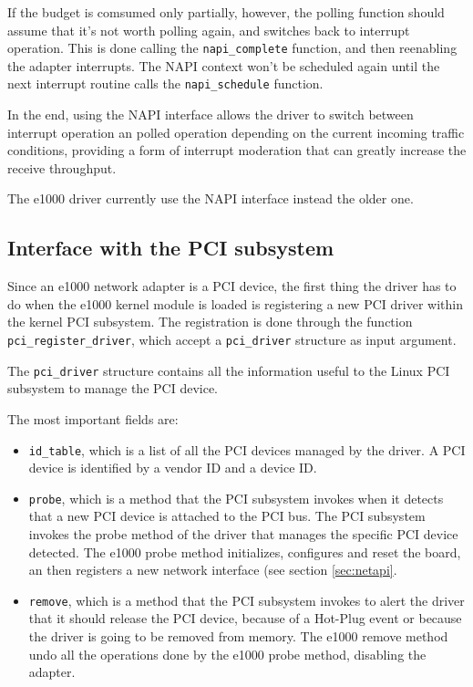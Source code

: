 If the budget is comsumed only partially, however, the polling function should assume that it's not worth polling again, and switches back
to interrupt operation. This is done calling the \texttt{napi\_complete} function, and then reenabling the adapter interrupts. The NAPI
context won't be scheduled again until the next interrupt routine calls the \texttt{napi\_schedule} function.

\vspace{0.5cm}

In the end, using the NAPI interface allows the driver to switch between interrupt operation an polled operation depending on the current
incoming traffic conditions, providing a form of interrupt moderation that can greatly increase the receive throughput.

The e1000 driver currently use the NAPI interface instead the older one.


\subsection{Interface with the PCI subsystem}
Since an e1000 network adapter is a PCI device, the first thing the driver has to do when the e1000 kernel module is loaded is 
registering a new PCI driver within the kernel PCI subsystem. The registration is done through the function \texttt{pci\_register\_driver},
which accept a \texttt{pci\_driver} structure as input argument.

The \texttt{pci\_driver} structure contains all the information useful to the Linux PCI subsystem to manage the PCI device.

The most important fields are:
\begin{itemize}
    \item \texttt{id\_table}, which is a list of all the PCI devices managed by the driver. A PCI device is identified by
	  a vendor ID and a device ID.
    \item \texttt{probe}, which is a method that the PCI subsystem invokes when it detects that a new PCI device is attached to
	  the PCI bus. The PCI subsystem invokes the probe method of the driver that manages the specific PCI device
	  detected. The e1000 probe method initializes, configures and reset the board, an then registers a new network interface (see
	  section \ref{sec:netapi}.
    \item \texttt{remove}, which is a method that the PCI subsystem invokes to alert the driver that it should release the PCI device,
	  because of a Hot-Plug event or because the driver is going to be removed from memory. The e1000 remove method undo all the
	  operations done by the e1000 probe method, disabling the adapter.
\end{itemize}

